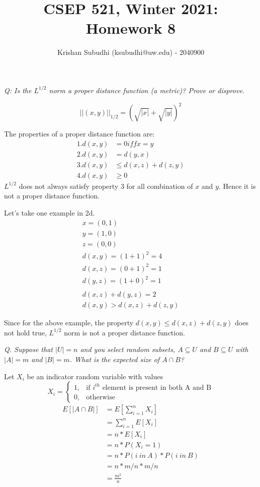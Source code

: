\documentclass{homeworg}
\title{CSEP 521, Winter 2021: Homework 8}
\author{Krishan Subudhi (ksubudhi@uw.edu) - 2040900}
\begin{document}
\maketitle

\exercise
\emph{Q: Is the $L^{1/2}$ norm a proper distance function (a metric)? Prove or disprove.}

\begin{equation}
\label{eq:1}
    ||(x, y)||_{1/2} =  (\sqrt{|x|}+\sqrt{|y|})^2
\end{equation}

The properties of a proper distance function are:
\begin{align*}
1. d(x,y) &= 0 iff x = y\\
2. d(x,y) &= d(y,x) \\
3. d(x,y) &\le d(x,z) + d(z,y)\\ 
4. d(x,y) &\ge 0
\end{align*}
$L^{1/2}$  does not always satisfy property 3 for all combination of $x$ and $y$. Hence it is not a proper distance function.

Let's take one example in 2d.
\begin{align*}
x = (0,1)\\
y = (1,0)\\
z = (0,0)\\
d(x,y) = (1+1)^2 = 4\\
d(x,z) = (0+1)^2 = 1\\
d(y,z) = (1+0)^2 = 1\\
\\
d(x,z) +d(y,z)  = 2\\
d(x,y) > d(x,z) + d(z,y)
\end{align*}
    
Since for the above example, the property $d(x,y) \le d(x,z) + d(z,y)$ does not hold true, $L^{1/2}$ norm is not a proper distance function.

\newpage
\exercise

\emph{Q. Suppose that $|U| = n$ and you select random subsets, $A \subseteq U$ and $B \subseteq U$ with $|A| = m$ and $|B| = m$. What is the expected size of $A \cap B$?}

Let $X_i$ be an indicator random variable with values
$$
X_i=\begin{cases}
			1, & \text{if $i^{th}$ element is present in both A and B}\\
            0, & \text{otherwise}
		 \end{cases}
$$
\begin{align*}
E[|A \cap B|] &= E[\sum_{i=1}^n{X_i}]\\
&=\sum_{i=1}^n{E[X_i]}\\
&= n \ast E[X_i]\\
&= n \ast P(X_i =1)\\
&= n \ast P(i \ in \ A) \ast P(i \ in \ B)\\
&= n \ast m/n \ast m/n\\
&= \frac{m^2}{n}
\end{align*}
\end{document}
